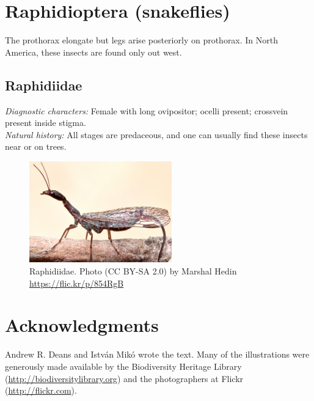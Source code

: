 \documentclass[letterpaper, 11pt]{article}
\begin{document}
\section{Raphidioptera (snakeflies)}
The prothorax elongate but legs arise posteriorly on prothorax. In North America, these insects are found only out west.\\

\subsection{Raphidiidae}
\noindent{}\textit{Diagnostic characters:} Female with long ovipositor; ocelli present; crossvein present inside stigma.\\

\noindent{}\textit{Natural history:} All stages are predaceous, and one can usually find these insects near or on trees.\\

\begin{figure}[ht!]
  \centering
    \includegraphics[width=0.55\textwidth]{RaphidiidHabitus}
  \caption{Raphidiidae. Photo (CC BY-SA 2.0) by Marshal Hedin \url{https://flic.kr/p/854RgB}}
  \label{fig:raphid}
\end{figure}

\FloatBarrier

\section*{Acknowledgments}
Andrew R. Deans and Istv\'an Mik\'o wrote the text. Many of the illustrations were generously made available by the Biodiversity Heritage Library (\url{http://biodiversitylibrary.org}) and the photographers at Flickr (\url{http://flickr.com}).

\FloatBarrier


\end{document}
